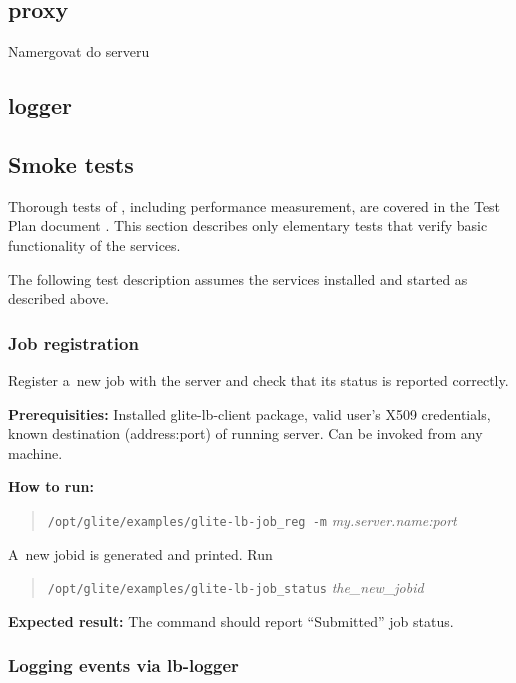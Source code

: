\subsection{\LB proxy}

Namergovat do serveru

\subsection{\LB logger}


\subsection{Smoke tests}


Thorough tests of \LB, including performance measurement, are
covered in the \LB Test Plan document \cite{lbtp}.
This section describes only elementary tests that verify basic
functionality of the services.

The following test description assumes the \LB services installed
and started as described above.

\def\req{\noindent\textbf{Prerequisities:}\xspace}
\def\how{\noindent\textbf{How to run:}\xspace}
\def\result{\noindent\textbf{Expected result:}\xspace}

\subsubsection{Job registration}

Register a~new job with the \LB server and check that its status is
reported correctly.

\req Installed glite-lb-client package, valid user's X509 credentials,
known destination (address:port) of running \LB server.
Can be invoked from any machine.

\how 
\begin{quote}
\verb'/opt/glite/examples/glite-lb-job_reg -m' \emph{my.server.name:port}
\end{quote}
A~new jobid is generated and printed.  Run 
\begin{quote}
\verb'/opt/glite/examples/glite-lb-job_status' \emph{the\_\/new\_\/jobid}
\end{quote}

\result
The command should report ``Submitted'' job status.

\subsubsection{Logging events via lb-logger}

